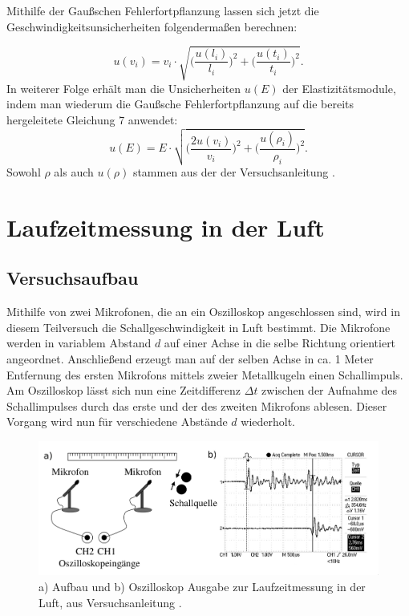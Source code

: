 \documentclass{article}
\begin{document}
Mithilfe der Gaußschen Fehlerfortpflanzung lassen sich jetzt die Geschwindigkeitsunsicherheiten folgendermaßen berechnen:

\begin{equation}
u(v_i)=  v_i \cdot \sqrt{\bigg(\frac{u(l_i)}{l_i}\bigg)^2 + \bigg(\frac{u(t_i)}{t_i}\bigg)^2}.
\end{equation}
In weiterer Folge erhält man die Unsicherheiten $u(E)$ der Elastizitätsmodule, indem man wiederum die Gaußsche Fehlerfortpflanzung auf die bereits hergeleitete Gleichung 7 anwendet:
\begin{equation}
u(E) = E \cdot \sqrt{\bigg(\frac{2u(v_i)}{v_i}\bigg)^2 + \bigg(\frac{u(\rho_i)}{\rho_i}\bigg)^2}.
\end{equation}
Sowohl $\rho$ als auch $u(\rho)$ stammen aus der der Versuchsanleitung \cite{1}.

\section{Laufzeitmessung in der Luft}
\subsection{Versuchsaufbau}
Mithilfe von zwei Mikrofonen, die an ein Oszilloskop angeschlossen sind, wird in diesem Teilversuch die Schallgeschwindigkeit in Luft bestimmt. Die Mikrofone werden in variablem Abstand $d$ auf einer Achse in die selbe Richtung orientiert angeordnet. Anschließend erzeugt man auf der selben Achse in ca. 1 Meter Entfernung des ersten Mikrofons mittels zweier Metallkugeln einen Schallimpuls. Am Oszilloskop lässt sich nun eine Zeitdifferenz $\Delta t$ zwischen der Aufnahme des Schallimpulses durch das erste und der des zweiten Mikrofons ablesen. Dieser Vorgang wird nun für verschiedene Abstände $d$ wiederholt.
\begin{figure}[hbt!]
\centering
\includegraphics[scale=0.2]{aufbau_luft.png}
\caption{a) Aufbau und b) Oszilloskop Ausgabe zur Laufzeitmessung in der Luft, aus Versuchsanleitung \cite{1}.}
\end{figure}
\end{document}
